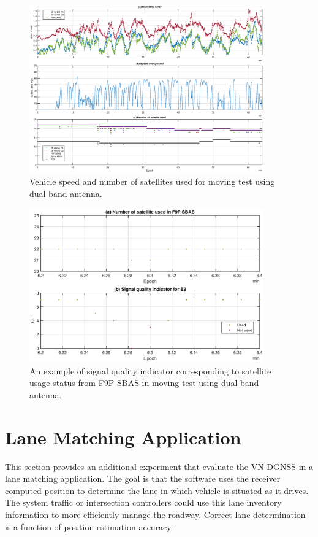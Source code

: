 \documentclass[letterpaper, 10 pt,onecolumn]{article}
\begin{document}
	\begin{figure}[H]
		\centering
		\includegraphics[width=0.9\textwidth]{figures/dynamicinfo_dual.eps}
		\caption{Vehicle speed and number of satellites used for moving test using dual band antenna.}
		\label{fig:m2vspeed}
	\end{figure}
	
	\begin{figure}[H]		
		\centering		
		\includegraphics[width=0.9\textwidth]{figures/Qi.eps}		
		\caption{An example of signal quality indicator corresponding to satellite usage status from F9P SBAS in moving test using dual band antenna.}		
		\label{fig:qi}	
	\end{figure}
	
	
	\section{Lane Matching Application}
	This section provides an additional experiment that evaluate the VN-DGNSS in a lane matching application. 
	The goal is that the software uses the receiver computed position to determine the lane in which vehicle is situated as it drives. The system traffic or intersection controllers could use this lane inventory information to more efficiently manage the roadway. Correct lane determination is a function of position estimation accuracy.
	
\end{document}
